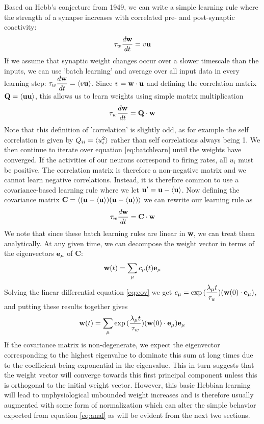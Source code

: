 \documentclass{article}
\begin{document}
Based on Hebb's conjecture from 1949, we can write a simple learning rule where the strength of a synapse increases with correlated pre- and post-synaptic coactivity:
\begin{equation}
\tau_w \dfrac{d\bf{w}}{dt} = v \bf{u}
\end{equation}
If we assume that synaptic weight changes occur over a slower timescale than the inputs, we can use 'batch learning' and average over all input data in every learning step:
$
\tau_w \dfrac{d\bf{w}}{dt} = \braket{v \bf{u}}
$.
Since $v = \bf{w} \cdot \bf{u} $ and defining the correlation matrix ${\bf Q} = \braket{{\bf u u} }$, this allows us to learn weights using simple matrix multiplication
\begin{equation}\label{eq:batchlearn}
\tau_w \dfrac{d\bf{w}}{dt} = \bf Q \cdot w
\end{equation}
Note that this definition of 'correlation' is slightly odd, as for example the self correlation is given by $Q_{ii} = \braket{u_i^2}$ rather than self correlations always being 1.
We then continue to iterate over equation \ref{eq:batchlearn} until the weights have converged. If the activities of our neurons correspond to firing rates, all $u_i$ must be positive. The correlation matrix is therefore a non-negative matrix and we cannot learn negative correlations. Instead, it is therefore common to use a covariance-based learning rule where we let $\bf u' = u-\braket{u}$. Now defining the covariance matrix ${\bf C} = \braket{( {\bf u} - \braket{\bf u})  ( {\bf u} - \braket{\bf u})}$ we can rewrite our learning rule as
\begin{equation}\label{eq:cov}
\tau_w \dfrac{d\bf{w}}{dt} = \bf C \cdot w
\end{equation}
We note that since these batch learning rules are linear in \textbf{w}, we can treat them analytically.
At any given time, we can decompose the weight vector in terms of the eigenvectors ${\bf e}_\mu$ of \textbf{C}:
\begin{equation}
{\bf w}(t) = \sum_\mu{ c_\mu(t) {\bf e}_\mu }
\end{equation}
Solving the linear differential equation \ref{eq:cov} we get
$
c_\mu = \exp{( \dfrac{\lambda_\mu t}{\tau_w})}({\bf w}(0) \cdot {\bf e_\mu})
$,
and putting these results together gives
\begin{equation}\label{eq:anal}
{\bf w}(t) = \sum_\mu{ \exp{( \dfrac{\lambda_\mu t}{\tau_w})}({\bf w}(0) \cdot {\bf e_\mu})  {\bf e}_\mu}
\end{equation}
If the covariance matrix is non-degenerate, we expect the eigenvector corresponding to the highest eigenvalue to dominate this sum at long times due to the coefficient being exponential in the eigenvalue. This in turn suggests that the weight vector will converge towards this first principal component unless this is orthogonal to the initial weight vector.
However, this basic Hebbian learning will lead to unphysiological unbounded weight increases and is therefore usually augmented with some form of normalization which can alter the simple behavior expected from equation \ref{eq:anal} as will be evident from the next two sections.
\end{document}
